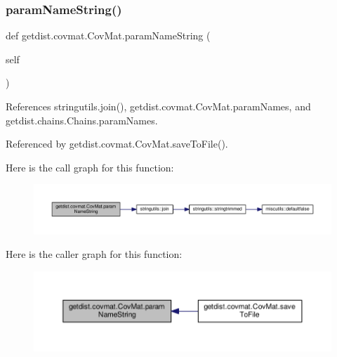 \subsubsection{\texorpdfstring{param\+Name\+String()}{paramNameString()}}
{\footnotesize\ttfamily def getdist.\+covmat.\+Cov\+Mat.\+param\+Name\+String (\begin{DoxyParamCaption}\item[{}]{self }\end{DoxyParamCaption})}



References stringutils.\+join(), getdist.\+covmat.\+Cov\+Mat.\+param\+Names, and getdist.\+chains.\+Chains.\+param\+Names.



Referenced by getdist.\+covmat.\+Cov\+Mat.\+save\+To\+File().

Here is the call graph for this function\+:
\nopagebreak
\begin{figure}[H]
\begin{center}
\leavevmode
\includegraphics[width=350pt]{classgetdist_1_1covmat_1_1CovMat_a4565752dad2a96822320edb84eda5c09_cgraph}
\end{center}
\end{figure}
Here is the caller graph for this function\+:
\nopagebreak
\begin{figure}[H]
\begin{center}
\leavevmode
\includegraphics[width=350pt]{classgetdist_1_1covmat_1_1CovMat_a4565752dad2a96822320edb84eda5c09_icgraph}
\end{center}
\end{figure}
\mbox{\label{classgetdist_1_1covmat_1_1CovMat_a5621f155a5025de50ea2a248811d5781}} 
